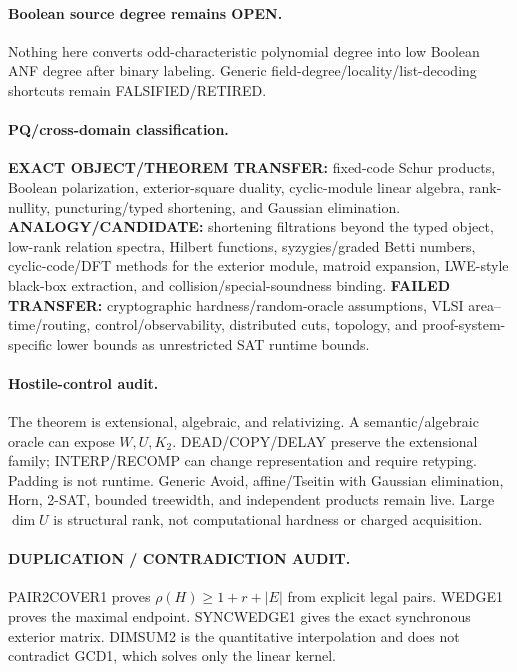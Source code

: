 \documentclass[11pt]{article}
\begin{document}
\paragraph{Boolean source degree remains OPEN.}
Nothing here converts odd-characteristic polynomial degree into low Boolean ANF degree after binary labeling. Generic field-degree/locality/list-decoding shortcuts remain FALSIFIED/RETIRED.

\paragraph{PQ/cross-domain classification.}
\textbf{EXACT OBJECT/THEOREM TRANSFER:} fixed-code Schur products, Boolean polarization, exterior-square duality, cyclic-module linear algebra, rank-nullity, puncturing/typed shortening, and Gaussian elimination.
\textbf{ANALOGY/CANDIDATE:} shortening filtrations beyond the typed object, low-rank relation spectra, Hilbert functions, syzygies/graded Betti numbers, cyclic-code/DFT methods for the exterior module, matroid expansion, LWE-style black-box extraction, and collision/special-soundness binding.
\textbf{FAILED TRANSFER:} cryptographic hardness/random-oracle assumptions, VLSI area--time/routing, control/observability, distributed cuts, topology, and proof-system-specific lower bounds as unrestricted SAT runtime bounds.

\paragraph{Hostile-control audit.}
The theorem is extensional, algebraic, and relativizing. A semantic/algebraic oracle can expose \(W,U,K_2\). DEAD/COPY/DELAY preserve the extensional family; INTERP/RECOMP can change representation and require retyping. Padding is not runtime. Generic Avoid, affine/Tseitin with Gaussian elimination, Horn, 2-SAT, bounded treewidth, and independent products remain live. Large \(\dim U\) is structural rank, not computational hardness or charged acquisition.

\paragraph{DUPLICATION / CONTRADICTION AUDIT.}
PAIR2COVER1 proves \(\rho(H)\ge1+r+|E|\) from explicit legal pairs. WEDGE1 proves the maximal endpoint. SYNCWEDGE1 gives the exact synchronous exterior matrix. DIMSUM2 is the quantitative interpolation and does not contradict GCD1, which solves only the linear kernel.
\end{document}
